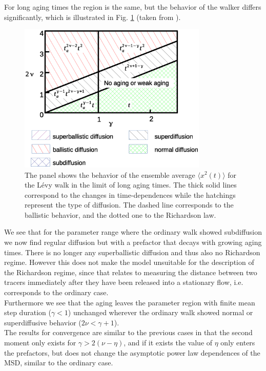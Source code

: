 For long aging times the region is the same, but the behavior of the walker differs significantly, which is illustrated in Fig. \ref{fig:resultsMSDaged} (taken from \cite{bothe}). 
%
\begin{figure}[h!]
\begin{center}
\includegraphics[width=90mm]{pics/resultsMSDaged.eps}
\caption{The panel shows the behavior of the ensemble average $\langle x^2(t) \rangle$ for the L\'evy walk in the limit of long aging times. The thick solid lines correspond to the changes in time-dependences while the hatchings represent the type of diffusion. The dashed line corresponds to the ballistic behavior, and the dotted one to the Richardson law.
\label{fig:resultsMSDaged} }
\end{center}
\end{figure} 
%
We see that for the parameter range where the ordinary walk showed subdiffusion we now find regular diffusion but with a prefactor that decays with growing aging times. There is no longer any superballistic diffusion and thus also no Richardson regime. However this does not make the model unsuitable for the description of the Richardson regime, since that relates to measuring the distance between two tracers immediately after they have been released into a stationary flow, i.e. corresponds to the ordinary case.\\ Furthermore we see that the aging leaves the parameter region with finite mean step duration ($\gamma<1$) unchanged wherever the ordinary walk showed normal or superdiffusive behavior ($2\nu < \gamma +1$).\\
The results for convergence are similar to the previous cases in that the second moment only exists for $\gamma>2(\nu-\eta)$, and if it exists the value of $\eta$ only enters the prefactors, but does not change the asymptotic power law dependences of the MSD, similar to the ordinary case.\\

